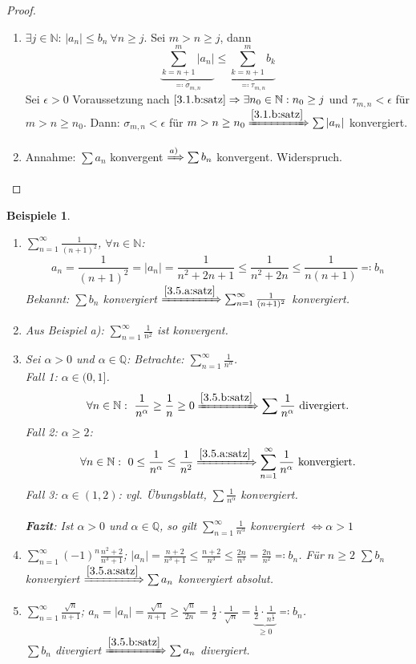 \documentclass{extreport}
\newcommand{\N}{\mathbb{N}}
\newcommand{\Q}{\mathbb{Q}}
\theoremstyle{named}
\theoremstyle{dotless}
\newtheorem*{beispiele}{Beispiele}
\begin{document}
\begin{proof} ~\
	\begin{enumerate}
		\item $\exists j \in \N$: $|a_{n}| \leq b_{n} ~\forall n \geq j$. Sei $m > n \geq j$, dann
			$$ \underbrace{\sum_{k=n+1}^{m}|a_{n}|}_{\eqqcolon \sigma_{m, n}} \leq \underbrace{\sum_{k=n+1}^{m} b_{k}}_{\eqqcolon \tau_{m,n}} $$
			Sei $\epsilon > 0$ Voraussetzung nach $\ref{3.1.b:satz} \Rightarrow \exists n_{0} \in \N: n_{0} \geq j$ und $\tau_{m,n} < \epsilon$ für $m > n \geq n_{0}$. Dann: $\sigma_{m,n} < \epsilon$ für $m > n \geq n_{0} \xRightarrow[]{\ref{3.1.b:satz}} \sum |a_{n}|$ konvergiert.
		\item Annahme: $\sum a_{n}$ konvergent $\xRightarrow[]{a)} \sum b_{n}$ konvergent. Widerspruch.
	\end{enumerate}	
\end{proof}


\begin{beispiele} ~\
	\begin{enumerate}
		\item $\sum_{n=1}^{\infty} \frac{1}{(n+1)^{2}}$, $\forall n \in \N$:
			$$ a_{n} = \frac{1}{(n+1)^{2}} = |a_{n}| = \frac{1}{n^{2} + 2n +1} \leq \frac{1}{n^{2} + 2n} \leq \frac{1}{n(n+1)} \eqqcolon b_{n} $$
			Bekannt: $\sum b_{n}$ konvergiert $\xRightarrow[]{\ref{3.5.a:satz}} \sum_{n=1}^{\infty} \frac{1}{(n+1)^{2}}$ konvergiert.
		\item Aus Beispiel a): $\sum_{n=1}^{\infty} \frac{1}{n^{2}}$ ist konvergent.
		\item Sei $\alpha > 0$ und $\alpha \in \Q$: Betrachte: $\sum_{n=1}^{\infty} \frac{1}{n^{\alpha}}$. \\
			Fall 1: $\alpha \in (0, 1]$.
				$$ \forall n \in \N: ~ \frac{1}{n^{\alpha}} \geq \frac{1}{n} \geq 0 \xRightarrow[]{\ref{3.5.b:satz}} \sum \frac{1}{n^{\alpha}} \text{ divergiert.} $$
			Fall 2: $\alpha \geq 2$: \\
				$$ \forall n \in \N: ~ 0 \leq \frac{1}{n^{\alpha}} \leq \frac{1}{n^{2}} \xRightarrow[]{\ref{3.5.a:satz}} \sum_{n=1}^{\infty} \frac{1}{n^{\alpha}} \text{ konvergiert.} $$
			Fall 3: $\alpha \in (1, 2)$: vgl. Übungsblatt, $\sum \frac{1}{n^{\alpha}}$ konvergiert. \\ \\
			\textbf{Fazit}: Ist $\alpha > 0$ und $\alpha \in \Q$, so gilt $\sum_{n=1}^{\infty} \frac{1}{n^{\alpha}}$ konvergiert $\Leftrightarrow \alpha > 1$
		\item $\sum_{n=1}^{\infty} (-1)^{n} \frac{n^{2} + 2}{n^{3} + 1}$; $|a_{n}| = \frac{n+2}{n^{3} + 1} \leq \frac{n+2}{n^{3}} \leq \frac{2n}{n^{3}} = \frac{2n}{n^{2}} \eqqcolon b_{n}$. Für $n \geq 2$ $\sum b_{n}$ konvergiert $\xRightarrow[]{\ref{3.5.a:satz}} \sum a_{n}$ konvergiert absolut.
		\item $\sum_{n=1}^{\infty} \frac{\sqrt{n}}{n+1}$; $a_{n} = |a_{n}| = \frac{\sqrt{n}}{n+1} \geq \frac{\sqrt{n}}{2n} = \frac{1}{2} \cdot \frac{1}{\sqrt{n}} = \underbrace{\frac{1}{2} \cdot \frac{1}{n^{\frac{1}{2}}}}_{\geq 0} \eqqcolon b_{n}$. \\
			$\sum b_{n}$ divergiert $\xRightarrow[]{\ref{3.5.b:satz}} \sum a_{n}$ divergiert.
	\end{enumerate}		
\end{beispiele}
\end{document}
